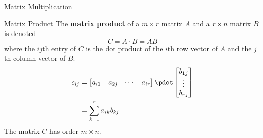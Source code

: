 \documentclass{beamer}
\begin{document}
\begin{frame}{Matrix Multiplication}
\begin{block}{Matrix Product}
The \textbf{matrix product} of a $m\times r$ matrix $A$ and a $r\times n$ matrix $B$ is denoted
\begin{equation*}
C=A\cdot B=AB
\end{equation*}
where the $ij$th entry of $C$ is the dot product of the $i$th row vector of $A$ and the $j$th column vector of $B$:
\begin{equation*}
\begin{split}
c_{ij}&=\begin{bmatrix}a_{i1}&a_{2j}&\cdots&a_{ir}\end{bmatrix}\pdot
\begin{bmatrix}b_{1j}\\\vdots\\b_{rj}\end{bmatrix}\\
&=\sum_{k=1}^{r}a_{ik}b_{kj}
\end{split}
\end{equation*}
The matrix $C$ has order $m\times n$.
\end{block}
\end{frame}
\end{document}
